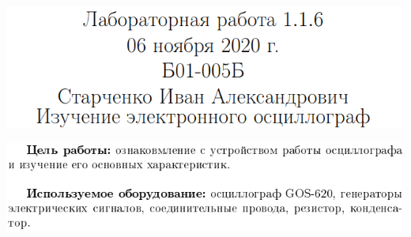 \documentclass[a4paper,12pt]{article} %
\begin{document}
\begin{center}
\includegraphics{10}
\end{center}
\begin{center}
\includegraphics{1}
\end{center}
\end{document}
